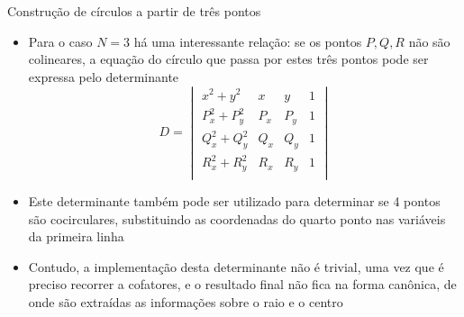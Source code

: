 \begin{frame}[fragile]{Construção de círculos a partir de três pontos}

    \begin{itemize}
        \item Para o caso $N = 3$ há uma interessante relação: se os pontos $P, Q, R$ não são 
            colineares, a equação do círculo que passa por estes três pontos pode ser expressa pelo determinante 
        \[
            D = \begin{vmatrix}
                x^2 + y^2 & x & y & 1 \\
                P_x^2 + P_y^2 & P_x & P_y & 1 \\
                Q_x^2 + Q_y^2 & Q_x & Q_y & 1 \\
                R_x^2 + R_y^2 & R_x & R_y & 1 \\
            \end{vmatrix}
        \]

        \item Este determinante também pode ser utilizado para determinar se 4 pontos são cocirculares, substituindo as coordenadas do quarto ponto nas variáveis da primeira linha

        \item Contudo, a implementação desta determinante não é trivial, uma vez que é preciso recorrer a cofatores, e o resultado final não fica na forma canônica, de onde são extraídas as informações sobre o raio e o centro
    \end{itemize}

\end{frame}


